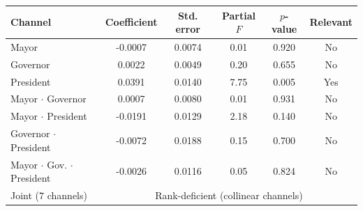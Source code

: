 \begin{tabular}{@{}lccccc@{}}
\toprule
Channel & Coefficient & Std. error & Partial $F$ & $p$-value & Relevant \\
\midrule
Mayor & -0.0007 & 0.0074 & 0.01 & 0.920 & No \\
Governor & 0.0022 & 0.0049 & 0.20 & 0.655 & No \\
President & 0.0391 & 0.0140 & 7.75 & 0.005 & Yes \\
Mayor $\cdot$ Governor & 0.0007 & 0.0080 & 0.01 & 0.931 & No \\
Mayor $\cdot$ President & -0.0191 & 0.0129 & 2.18 & 0.140 & No \\
Governor $\cdot$ President & -0.0072 & 0.0188 & 0.15 & 0.700 & No \\
Mayor $\cdot$ Gov. $\cdot$ President & -0.0026 & 0.0116 & 0.05 & 0.824 & No \\
\midrule
Joint ($7$ channels) & \multicolumn{5}{c}{Rank-deficient (collinear channels)} \\
\bottomrule
\end{tabular}
